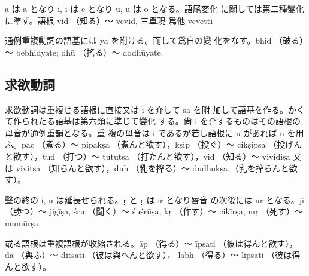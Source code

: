 a は ā となり i, ī は e となり u, ū は o となる。語尾変化
に關しては第二種變化に準ず。語根 vid （知る）～ vevid, 三單現
爲他 vevetti

\numberParagraph
通例重複動詞の語基には ya を附ける。而して爲自の變
化をなす。bhid （破る）～ bebhidyate; dhū （搖る）～ dodhūyate.

\subsection{求欲動詞}
\numberParagraph
求欲動詞は重複せる語根に直接又は i を介して sa を附
加して語基を作る。かくて作られたる語基は第六類に準じて變化
する。尙 i を介するものはその語根の母音が通例重韻となる。重
複の母音は i であるが若し語根に u があれば u を用ふ。pac
（煮る）～ pipakṣa （煮んと欲す），kṣip （投ぐ）～ cikṣipsa （投げん
と欲す），tud （打つ）～ tututsa （打たんと欲す），vid （知る）～
vividiṣa 又は vivitsa （知らんと欲す），duh （乳を搾る）～
dudhukṣa （乳を搾らんと欲す）。

\numberParagraph
聲の終の i, u は延長せられる。ṛ と ṝ は īr となり唇音
の次後には ūr となる。ji （勝つ）～ jigīṣa, śru （聞く）～ śuśrūṣa,
kṛ （作す）～ cikīrṣa, mṛ （死す）～ mumūrṣa.

\numberParagraph
或る語根は重複語根が收縮される。āp （得る）～ īpsati
（彼は得んと欲す），dā （與ふ）～ ditsati （彼は與へんと欲す），
labh （得る）～ lipsati （彼は得んと欲す）。

